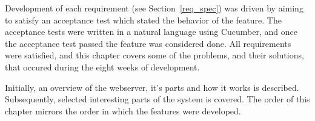 
Development of each requirement (see Section~\ref{req_spec}) was driven by
aiming to satisfy an acceptance test which stated the behavior of the feature.
The acceptance tests were written in a natural language using Cucumber, and
once the acceptance test passed the feature was considered done. All
requirements were satisfied, and this chapter covers some of the problems, and
their solutions, that occured during the eight weeks of development.

Initially, an overview of the webserver, it's parts and how it works is
described. Subsequently, selected interesting parts of the system is covered.
The order of this chapter mirrors the order in which the features were
developed.
